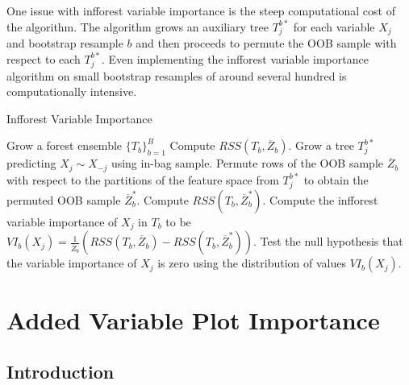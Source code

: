 \documentclass[12pt,twoside]{reedthesis}
\theoremstyle{definition}
\theoremstyle{definition}
\theoremstyle{definition}
\theoremstyle{remark}
\begin{document}
One issue with infforest variable importance is the steep computational
cost of the algorithm. The algorithm grows an auxiliary tree
\(T_{j}^{b*}\) for each variable \(X_j\) and bootstrap resample \(b\)
and then proceeds to permute the OOB sample with respect to each
\(T_j^{b*}\). Even implementing the infforest variable importance
algorithm on small bootstrap resamples of around several hundred is
computationally intensive. \par
\begin{algorithm}
    \caption{Infforest Variable Importance} \label{infforest variable importance}
      \begin{algorithmic}[1]
        \State Grow a forest ensemble $\{T_b\}_{b=1}^B$
              \State Compute $RSS(T_b,\overline{Z}_b)$.
              \State Grow a tree $T_j^{b*}$ predicting $X_j\sim X_{-j}$ using in-bag sample.
              \State Permute rows of the OOB sample $\overline{Z}_b$ with respect to the partitions of the feature space from $T_j^{b*}$ to obtain the permuted OOB sample $\overline{Z}_b^*$. 
              \State Compute $RSS(T_b,\overline{Z}_b^*)$.
              \State Compute the infforest variable importance of $X_j$ in $T_b$ to be $VI_b(X_j)=\frac{1}{\overline{Z}_b}\left(RSS(T_b,\overline{Z}_b)-RSS(T_b,\overline{Z}_b^*)\right)$.  
            \EndFor
            \State Test the null hypothesis that the variable importance of $X_j$ is zero using the distribution of values $VI_b(X_j)$. 
          \EndFor
      \end{algorithmic}
  \end{algorithm}
\chapter{Added Variable Plot
Importance}\label{added-variable-plot-importance}

\section{Introduction}\label{introduction-2}
\end{document}
